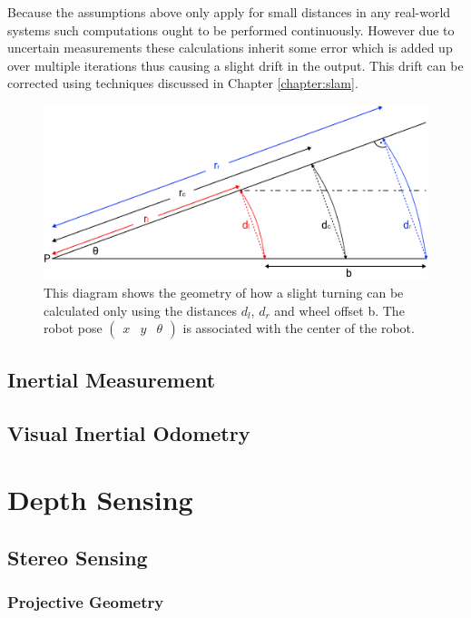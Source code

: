 Because the assumptions above only apply for small distances in any real-world systems such computations ought to be performed continuously. However due to uncertain measurements these calculations inherit some error which is added up over multiple iterations thus causing a slight drift in the output. This drift can be corrected using techniques discussed in Chapter \ref{chapter:slam}.

\begin{figure}
	\centering
	\includegraphics[width=0.8\linewidth]{img/odom}
	\caption{
		This diagram shows the geometry of how a slight turning can be calculated only using the distances $d_{l}$, $d_{r}$ and wheel offset b.
		The robot pose 
		$
			\begin{pmatrix}
				x &
				y &
				\theta 
			\end{pmatrix}
		$
		is associated with the center of the robot.
	}
	\label{fig:odom}
\end{figure}


\subsection{Inertial Measurement}

\subsection{Visual Inertial Odometry}


\section{Depth Sensing}

\subsection{Stereo Sensing}

\subsubsection{Projective Geometry}

